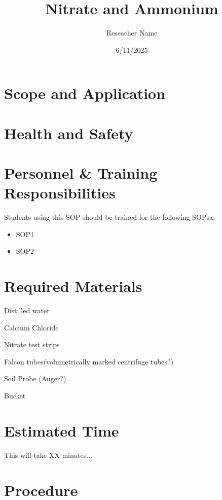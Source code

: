 \documentclass[12pt]{../SOP4_alpha}\usepackage[]{graphicx}\usepackage[]{xcolor}
\title{Nitrate and Ammonium}
\date{6/11/2025}
\author{Reseacher Name}
\begin{document}

\maketitle

\section{Scope and Application}

\NP \blindtext

\NP \lipsum[1]

\section{Health and Safety}

\NP \lipsum[2]


\section{Personnel \& Training Responsibilities}

\NP \lipsum[1]

Students using this SOP should be trained for the following SOPsa:

\begin{itemize}
  \item SOP1
  \item SOP2
\end{itemize}


\section{Required Materials}

\NP Distilled water

\NP Calcium Chloride

\NP Nitrate test strips

\NP Falcon tubes(volumetrically marked centrifuge tubes?)

\NP Soil Probe (Auger?)

\NP Bucket

\section{Estimated Time}

\NP This will take XX minutes...

\section{Procedure}
\end{document}

